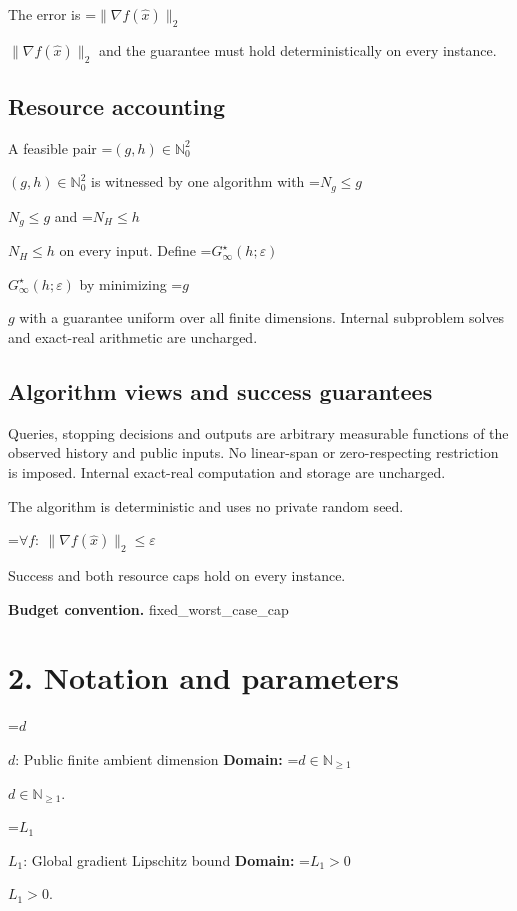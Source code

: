 \documentclass[10pt,a4paper]{article}
\newcommand{\AtlasMath}[1]{\par\begingroup\centering\setbox0=\hbox{$\displaystyle #1$}\ifdim\wd0>1.4\linewidth\typeout{ATLAS WIDE FORMULA: \the\wd0}\fi\ifdim\wd0>\linewidth\resizebox{\linewidth}{!}{\box0}\else\box0\fi\par\endgroup}
\newcommand{\AtlasInlineMath}[1]{\begingroup\setbox0=\hbox{$#1$}\ifdim\wd0>.4\linewidth\endgroup\AtlasMath{#1}\else\endgroup$#1$\fi}
\begin{document}
The error is \AtlasInlineMath{\|\nabla f(\widehat x)\|_2} and the guarantee must hold deterministically on every instance.



\subsection{Resource accounting}


A feasible pair \AtlasInlineMath{(g,h)\in\mathbb N_0^2} is witnessed by one algorithm with \AtlasInlineMath{N_g\le g} and \AtlasInlineMath{N_H\le h} on every input. Define \AtlasInlineMath{G^\star_\infty(h;\varepsilon)} by minimizing \AtlasInlineMath{g} with a guarantee uniform over all finite dimensions. Internal subproblem solves and exact-real arithmetic are uncharged.



\subsection{Algorithm views and success guarantees}


Queries, stopping decisions and outputs are arbitrary measurable functions of the observed history and public inputs. No linear-span or zero-respecting restriction is imposed. Internal exact-real computation and storage are uncharged.



The algorithm is deterministic and uses no private random seed.




\AtlasMath{\forall f:\ \|\nabla f(\widehat x)\|_2\le\varepsilon}




Success and both resource caps hold on every instance.



\textbf{Budget convention.} fixed\_worst\_case\_cap



\section{2. Notation and parameters}


\AtlasInlineMath{d}: Public finite ambient dimension \textbf{Domain:} \AtlasInlineMath{d\in\mathbb N_{\ge1}}.



\AtlasInlineMath{L_1}: Global gradient Lipschitz bound \textbf{Domain:} \AtlasInlineMath{L_1>0}.
\end{document}
